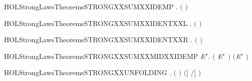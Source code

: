 \newcommand{\HOLStrongLawsTheoremsSTRONGXXSUMXXCOMM}{\UseVerbatim{HOLStrongLawsTheoremsSTRONGXXSUMXXCOMM}}
\begin{SaveVerbatim}{HOLStrongLawsTheoremsSTRONGXXSUMXXIDEMP}
\HOLTokenTurnstile{} \HOLSymConst{\HOLTokenForall{}}.  \ensuremath{(} \HOLSymConst{\ensuremath{+}} \ensuremath{)} 
\end{SaveVerbatim}
\newcommand{\HOLStrongLawsTheoremsSTRONGXXSUMXXIDEMP}{\UseVerbatim{HOLStrongLawsTheoremsSTRONGXXSUMXXIDEMP}}
\begin{SaveVerbatim}{HOLStrongLawsTheoremsSTRONGXXSUMXXIDENTXXL}
\HOLTokenTurnstile{} \HOLSymConst{\HOLTokenForall{}}.  \ensuremath{(} \HOLSymConst{\ensuremath{+}} \ensuremath{)} 
\end{SaveVerbatim}
\newcommand{\HOLStrongLawsTheoremsSTRONGXXSUMXXIDENTXXL}{\UseVerbatim{HOLStrongLawsTheoremsSTRONGXXSUMXXIDENTXXL}}
\begin{SaveVerbatim}{HOLStrongLawsTheoremsSTRONGXXSUMXXIDENTXXR}
\HOLTokenTurnstile{} \HOLSymConst{\HOLTokenForall{}}.  \ensuremath{(} \HOLSymConst{\ensuremath{+}} \ensuremath{)} 
\end{SaveVerbatim}
\newcommand{\HOLStrongLawsTheoremsSTRONGXXSUMXXIDENTXXR}{\UseVerbatim{HOLStrongLawsTheoremsSTRONGXXSUMXXIDENTXXR}}
\begin{SaveVerbatim}{HOLStrongLawsTheoremsSTRONGXXSUMXXMIDXXIDEMP}
\HOLTokenTurnstile{} \HOLSymConst{\HOLTokenForall{}} \ensuremath{\HOLBoundVar{E}\sp{\prime}}.  \ensuremath{(} \HOLSymConst{\ensuremath{+}} \ensuremath{\HOLBoundVar{E}\sp{\prime}} \HOLSymConst{\ensuremath{+}} \ensuremath{)} \ensuremath{(}\ensuremath{\HOLBoundVar{E}\sp{\prime}} \HOLSymConst{\ensuremath{+}} \ensuremath{)}
\end{SaveVerbatim}
\newcommand{\HOLStrongLawsTheoremsSTRONGXXSUMXXMIDXXIDEMP}{\UseVerbatim{HOLStrongLawsTheoremsSTRONGXXSUMXXMIDXXIDEMP}}
\begin{SaveVerbatim}{HOLStrongLawsTheoremsSTRONGXXUNFOLDING}
\HOLTokenTurnstile{} \HOLSymConst{\HOLTokenForall{}} .  \ensuremath{(}  \ensuremath{)} \ensuremath{(}\ensuremath{[}  \ensuremath{/}\ensuremath{]} \ensuremath{)}
\end{SaveVerbatim}

